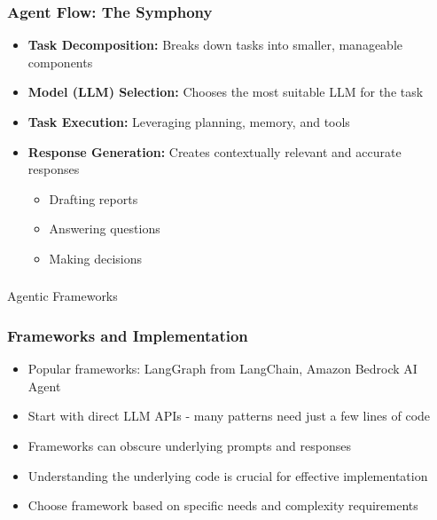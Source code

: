 \begin{frame}[fragile]\frametitle{Agent Flow: The Symphony}
\begin{itemize}
    \item \textbf{Task Decomposition:} Breaks down tasks into smaller, manageable components
    \item \textbf{Model (LLM) Selection:} Chooses the most suitable LLM for the task
    \item \textbf{Task Execution:} Leveraging planning, memory, and tools
    \item \textbf{Response Generation:} Creates contextually relevant and accurate responses
    \begin{itemize}
        \item Drafting reports
        \item Answering questions
        \item Making decisions
    \end{itemize}
\end{itemize}
\end{frame}

\begin{frame}[fragile]\frametitle{}
\begin{center}
{\Large Agentic Frameworks}
\end{center}
\end{frame}

\begin{frame}[fragile]\frametitle{Frameworks and Implementation}
\begin{itemize}
    \item Popular frameworks: LangGraph from LangChain, Amazon Bedrock AI Agent
    \item Start with direct LLM APIs - many patterns need just a few lines of code
    \item Frameworks can obscure underlying prompts and responses
    \item Understanding the underlying code is crucial for effective implementation
    \item Choose framework based on specific needs and complexity requirements
\end{itemize}
\end{frame}


